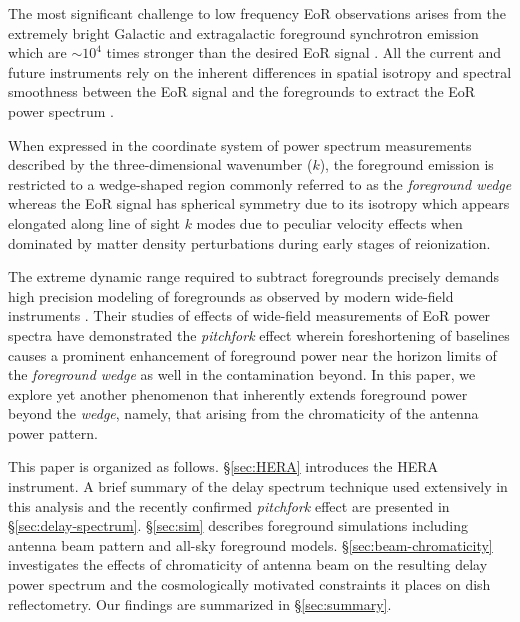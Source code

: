\documentclass[preprint2,iop,numberedappendix,twocolappendix,appendixfloats]{emulateapj}
\begin{document}
The most significant challenge to low frequency EoR observations arises from the extremely bright Galactic and extragalactic foreground synchrotron emission which are $\sim 10^4$ times stronger than the desired EoR signal \citep{dim02,ali08,ber09,ber10,gho12}. All the current and future instruments rely on the inherent differences in spatial isotropy and spectral smoothness between the EoR signal and the foregrounds to extract the EoR power spectrum \citep[see, e.g.,][]{fur04b,mor04,zal04,san05,fur06,mcq06,mor06,wan06,gle08}. 

When expressed in the coordinate system of power spectrum measurements described by the three-dimensional wavenumber ($k$), the foreground emission is restricted to a wedge-shaped region commonly referred to as the {\it foreground wedge} \citep{bow09,liu09,liu14a,liu14b,dat10,liu11,gho12,mor12,par12b,tro12,ved12,dil13,pob13,thy13,dil14} whereas the EoR signal has spherical symmetry due to its isotropy which appears elongated along line of sight $k$ modes due to peculiar velocity effects when dominated by matter density perturbations during early stages of reionization. 

The extreme dynamic range required to subtract foregrounds precisely demands high precision modeling of foregrounds as observed by modern wide-field instruments \citep{thy15a,thy15b}. Their studies of effects of wide-field measurements of EoR power spectra have demonstrated the {\it pitchfork} effect wherein foreshortening of baselines causes a prominent enhancement of foreground power near the horizon limits of the {\it foreground wedge} as well in the contamination beyond. In this paper, we explore yet another phenomenon that inherently extends foreground power beyond the {\it wedge}, namely, that arising from the chromaticity of the antenna power pattern. %

This paper is organized as follows. \S\ref{sec:HERA} introduces the HERA instrument. A brief summary of the delay spectrum technique used extensively in this analysis and the recently confirmed {\it pitchfork} effect are presented in \S\ref{sec:delay-spectrum}. \S\ref{sec:sim} describes foreground simulations including antenna beam pattern and all-sky foreground models. \S\ref{sec:beam-chromaticity} investigates the effects of chromaticity of antenna beam on the resulting delay power spectrum and the cosmologically motivated constraints it places on dish reflectometry. Our findings are summarized in \S\ref{sec:summary}.
\end{document}
